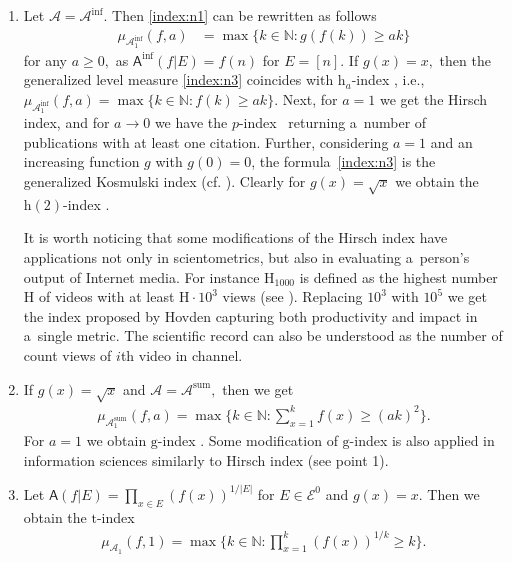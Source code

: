 \documentclass[preprint,11pt]{elsarticle}
\theoremstyle{definition}
\newcommand\mN{{\mathbb N}}
\newcommand\cE{{\mathcal E}}
\newcommand\sA{\mathsf{A}}
\newcommand{\rH}{\mathrm{H}}
\newcommand\aA[2][E]{\sA(#2|#1)}%
\newcommand\aAi[3][E]{\sA^{#3}(#2|#1)}%
\newcommand\bA{\mathscr{A}}%
\newcommand\mub[1][\bA]{\mu_{#1}}
\renewcommand\ge{\geqslant}
\newcommand{\tx}{\textstyle{}}
\begin{document}
\begin{enumerate}[noitemsep]
\item   Let $\bA=\bA^{\inf}.$ Then \eqref{index:n1} can be rewritten as follows
\begin{align}\label{index:n3}       \mub[\bA_1^{\text{inf}}](f,a)&=\max\{k\in \mN\colon g(f(k))\ge ak\}
\end{align}
for any $a\ge 0,$ as $\aAi{f}{\inf}=f(n)$ for $E=[n].$ If $g(x)=x,$ then the generalized level measure \eqref{index:n3} coincides with $\mathrm{h}_a$-index %
\cite[Def.\,2.4]{eck}, i.e.,
$\mub[\bA_1^{\text{inf}}](f,a)=\max\{k\in \mN\colon f(k)\ge a k\}.$
Next, for $a=1$ we get the Hirsch index, and for $a\to 0$ we have the $p$-index~\cite[Def.\,2.5]{eck} returning a~number of publications with at least one citation.
Further, considering $a=1$ and an increasing function $g$ with $g(0)=0$,
the formula~\eqref{index:n3} is the generalized Kosmulski index (cf. \cite{boczek20,deineko}). Clearly for $g(x)=\sqrt{x}$ we obtain the $\mathrm{h}(2)$-index \cite{kosmulski}.

It is worth noticing that some modifications of the Hirsch index have applications not only in scientometrics, but also in evaluating a~person’s output of Internet media. For instance $\mathrm{H}_{1000}$ is defined as the highest number $\mathrm{H}$ of videos with at least $\mathrm{H}\cdot 10^3$ views (see \cite{martinez}). Replacing $10^3$ with $10^5$ we get the index proposed by Hovden \cite{hovden} capturing both productivity and impact in a~single metric.
The scientific record  can also be understood as the number of count views of $i$th video in channel.

\item If $g(x)=\sqrt{x}$ and $\bA=\bA^{\textrm{sum}},$ then we get
    \begin{align*}
        \mub[\bA_1^\text{sum}](f,a)=\max\Big\{k\in\mN\colon \sum_{x=1}^{k} f(x)\ge (ak)^2\Big\}.
    \end{align*}
For $a=1$ we obtain $\mathrm{g}$-index \cite[Def.\,3.1]{eck}. Some modification of $\mathrm{g}$-index is also applied in information sciences similarly to Hirsch index (see point 1).

    \item Let $\aA{f}=\tx{\prod_{x\in E} (f(x))^{1/|E|}}$ for $E\in\cE^0$ and $g(x)=x.$ Then we obtain the $\mathrm{t}$-index \cite[formula~(4)]{tol}
    \begin{align*}
        \mub[\bA_1](f,1)=\max\Big\{k\in \mN\colon \prod_{x=1}^k (f(x))^{1/k}\ge k\Big\}.
    \end{align*}


\end{enumerate}
\end{document}
